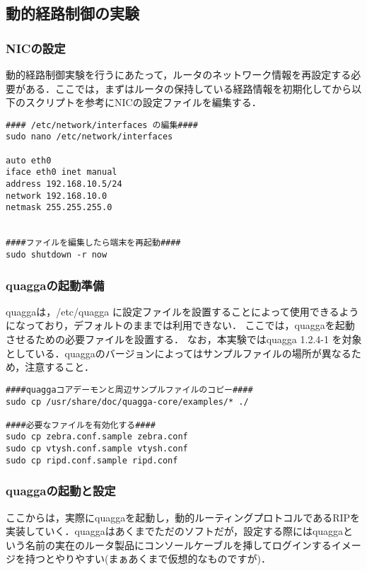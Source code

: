 \subsection{動的経路制御の実験}
\vspace{-6mm}
\subsubsection{NICの設定}
動的経路制御実験を行うにあたって，ルータのネットワーク情報を再設定する必要がある．ここでは，まずはルータの保持している経路情報を初期化してから以下のスクリプトを参考にNICの設定ファイルを編集する．

\begin{shadebox}
\begin{verbatim}
#### /etc/network/interfaces の編集####
sudo nano /etc/network/interfaces

auto eth0
iface eth0 inet manual
address 192.168.10.5/24
network 192.168.10.0
netmask 255.255.255.0


####ファイルを編集したら端末を再起動####
sudo shutdown -r now

\end{verbatim}
\end{shadebox}


\vspace{-6mm}
\subsubsection{quaggaの起動準備}
quaggaは，/etc/quagga に設定ファイルを設置することによって使用できるようになっており，デフォルトのままでは利用できない．
ここでは，quaggaを起動させるための必要ファイルを設置する．
なお，本実験ではquagga 1.2.4-1 を対象としている．quaggaのバージョンによってはサンプルファイルの場所が異なるため，注意すること．
\begin{shadebox}
\begin{verbatim}
####quaggaコアデーモンと周辺サンプルファイルのコピー####
sudo cp /usr/share/doc/quagga-core/examples/* ./

####必要なファイルを有効化する####
sudo cp zebra.conf.sample zebra.conf
sudo cp vtysh.conf.sample vtysh.conf
sudo cp ripd.conf.sample ripd.conf

\end{verbatim}
\end{shadebox}


\vspace{-6mm}
\subsubsection{quaggaの起動と設定}
ここからは，実際にquaggaを起動し，動的ルーティングプロトコルであるRIPを実装していく．quaggaはあくまでただのソフトだが，設定する際にはquaggaという名前の実在のルータ製品にコンソールケーブルを挿してログインするイメージを持つとやりやすい(まぁあくまで仮想的なものですが)．

